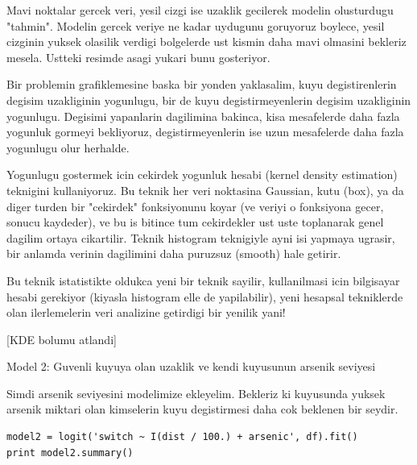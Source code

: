 \documentclass[12pt,fleqn]{article}\usepackage{../common}
\begin{document}
Mavi noktalar gercek veri, yesil cizgi ise uzaklik gecilerek modelin
olusturdugu "tahmin". Modelin gercek veriye ne kadar uydugunu
goruyoruz boylece, yesil cizginin yuksek olasilik verdigi bolgelerde
ust kismin daha mavi olmasini bekleriz mesela. Ustteki resimde asagi
yukari bunu gosteriyor.

Bir problemin grafiklemesine baska bir yonden yaklasalim, kuyu
degistirenlerin degisim uzakliginin yogunlugu, bir de kuyu
degistirmeyenlerin degisim uzakliginin yogunlugu. Degisimi yapanlarin
dagilimina bakinca, kisa mesafelerde daha fazla yogunluk gormeyi bekliyoruz,
degistirmeyenlerin ise uzun mesafelerde daha fazla yogunlugu olur herhalde.

Yogunlugu gostermek icin cekirdek yogunluk hesabi (kernel density
estimation) teknigini kullaniyoruz. Bu teknik her veri noktasina
Gaussian, kutu (box), ya da diger turden bir "cekirdek" fonksiyonunu
koyar (ve veriyi o fonksiyona gecer, sonucu kaydeder), ve bu is
bitince tum cekirdekler ust uste toplanarak genel dagilim ortaya
cikartilir. Teknik histogram teknigiyle ayni isi yapmaya ugrasir, bir
anlamda verinin dagilimini daha puruzsuz (smooth) hale getirir. 

Bu teknik istatistikte oldukca yeni bir teknik sayilir, kullanilmasi
icin bilgisayar hesabi gerekiyor (kiyasla histogram elle de
yapilabilir), yeni hesapsal tekniklerde olan ilerlemelerin veri
analizine getirdigi bir yenilik yani!

[KDE bolumu atlandi]

Model 2: Guvenli kuyuya olan uzaklik ve kendi kuyusunun arsenik seviyesi

Simdi arsenik seviyesini modelimize ekleyelim. Bekleriz ki kuyusunda yuksek
arsenik miktari olan kimselerin kuyu degistirmesi daha cok beklenen bir
seydir.

\begin{verbatim}
model2 = logit('switch ~ I(dist / 100.) + arsenic', df).fit()
print model2.summary()
\end{verbatim}
\end{document}

